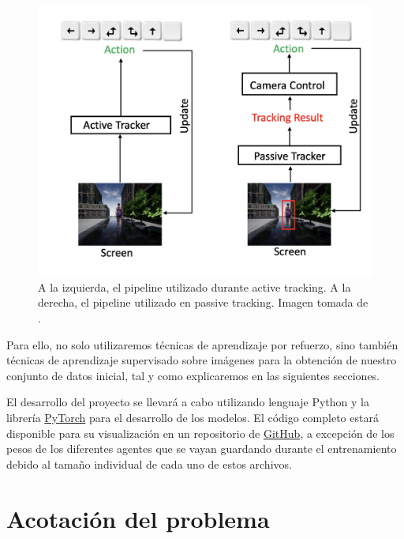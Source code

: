 \begin{figure}[ht!]
\centering
\includegraphics[scale=0.4]{figuras/active_tracking_vs_passive_tracking.png}
\caption[A la izquierda, el pipeline utilizado durante active tracking. A la derecha, el pipeline utilizado en passive tracking.]{A la izquierda, el pipeline utilizado durante active tracking. A la derecha, el pipeline utilizado en passive tracking. Imagen tomada de \citet{luo2019end}.}
\label{fig-active-tracking}
\end{figure}
\medskip

Para ello, no solo utilizaremos técnicas de aprendizaje por refuerzo, sino también técnicas de aprendizaje supervisado sobre imágenes para la obtención de nuestro conjunto de datos inicial, tal y como explicaremos en las siguientes secciones.
\medskip

El desarrollo del proyecto se llevará a cabo utilizando lenguaje Python y la librería \href{https://pytorch.org/}{PyTorch} para el desarrollo de los modelos. El código completo estará disponible para su visualización en un repositorio de \href{https://github.com/lucaswerner90/msc-degree-ai}{GitHub}, a excepción de los pesos de los diferentes agentes que se vayan guardando durante el entrenamiento debido al tamaño individual de cada uno de estos archivos.


\section{Acotación del problema}
\label{acotacion-del-problema}

